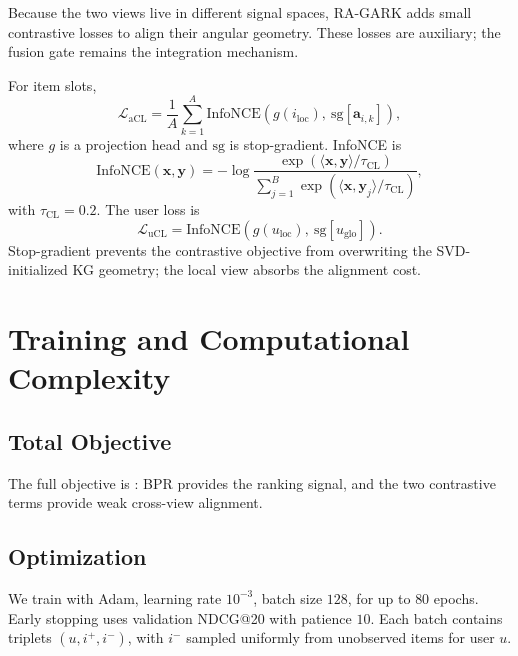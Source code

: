 Because the two views live in different signal spaces, RA-GARK adds small contrastive losses to align their angular geometry. These losses are auxiliary; the fusion gate remains the integration mechanism.

For item slots,
\begin{equation}
\label{eq:lacl}
\mathcal{L}_{\mathrm{aCL}} = \frac{1}{A} \sum_{k=1}^{A} \mathrm{InfoNCE}\!\left( g(i_{\mathrm{loc}}),\ \mathrm{sg}\!\left[\mathbf{a}_{i,k}\right] \right),
\end{equation}
where $g$ is a projection head and $\mathrm{sg}$ is stop-gradient. InfoNCE is
\begin{equation}
\label{eq:infonce}
\mathrm{InfoNCE}(\mathbf{x}, \mathbf{y}) = -\log \frac{\exp(\langle \mathbf{x}, \mathbf{y} \rangle / \tau_{\mathrm{CL}})}{\sum_{j=1}^{B} \exp(\langle \mathbf{x}, \mathbf{y}_j \rangle / \tau_{\mathrm{CL}})},
\end{equation}
with $\tau_{\mathrm{CL}}=0.2$. The user loss is
\begin{equation}
\label{eq:lucl}
\mathcal{L}_{\mathrm{uCL}} = \mathrm{InfoNCE}\!\left( g(u_{\mathrm{loc}}),\ \mathrm{sg}\!\left[u_{\mathrm{glo}}\right] \right).
\end{equation}
Stop-gradient prevents the contrastive objective from overwriting the SVD-initialized KG geometry; the local view absorbs the alignment cost.

\section{Training and Computational Complexity}
\label{sec:method-train}

\subsection{Total Objective}
\label{sec:train-objective}

The full objective is : BPR provides the ranking signal, and the two contrastive terms provide weak cross-view alignment.

\subsection{Optimization}
\label{sec:train-opt}

We train with Adam, learning rate $10^{-3}$, batch size $128$, for up to $80$ epochs. Early stopping uses validation NDCG@20 with patience $10$. Each batch contains triplets $(u,i^+,i^-)$, with $i^-$ sampled uniformly from unobserved items for user $u$.

